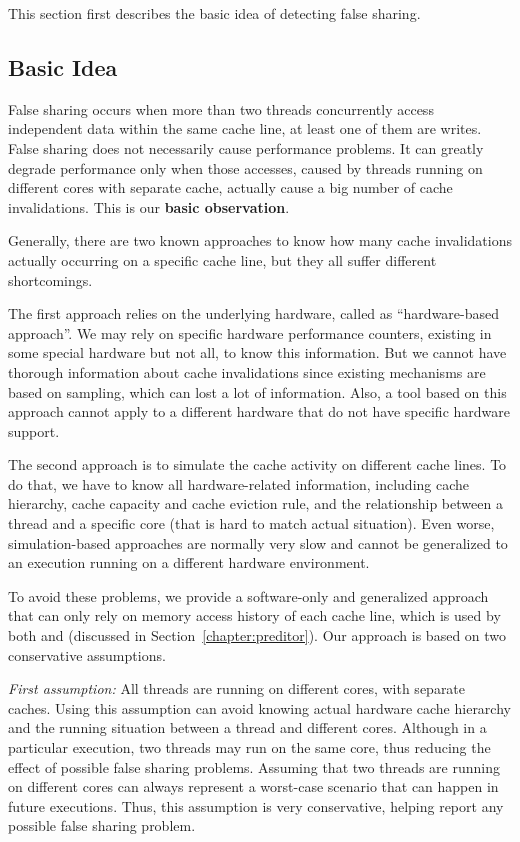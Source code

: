 \label{sec:detectfalseshare}

This section first describes the basic idea of detecting false sharing. 

\subsection{Basic Idea}
\label{sec:detectionidea}
False sharing occurs when more than two threads concurrently access independent data within the same cache line, at least one of them are writes. False sharing does not necessarily cause performance problems. It can greatly degrade performance only when those accesses, caused by threads running on different cores with separate cache, actually cause a big number of cache invalidations. This is our \textbf{basic observation}. 

Generally, there are two known approaches to know how many cache invalidations actually occurring on a specific cache line, but they all suffer different shortcomings. 

The first approach relies on the underlying hardware, called as ``hardware-based approach''. We may rely on specific hardware performance counters, existing in some special hardware but not all, to know this information. But we cannot have thorough information about cache invalidations since existing mechanisms are based on sampling, which can lost a lot of information. Also, a tool based on this approach cannot apply to a different hardware that do not have specific hardware support. 

The second approach is to simulate the cache activity on different cache lines. To do that, we have to know all hardware-related information, including cache hierarchy, cache capacity and cache eviction rule, and the relationship between a thread and a specific core (that is hard to match actual situation). Even worse, simulation-based approaches are normally very slow and cannot be generalized to an execution running on a different hardware environment. 

To avoid these problems, we provide a software-only and generalized approach that can only rely on memory access history of each cache line, which is used by both \SheriffDetect{} and \Predator{} (discussed in Section~\ref{chapter:preditor}). Our approach is based on two conservative assumptions.
  
{\it First assumption:} 
All threads are running on different cores, with separate caches. Using this assumption can avoid knowing actual hardware cache hierarchy and the running situation between a thread and different cores. Although in a particular execution, two threads may run on the same core, thus reducing the effect of possible false sharing problems. Assuming that two threads are running on different cores can always represent a worst-case scenario that can happen in future executions. Thus, this assumption is very conservative, helping report any possible false sharing problem. 

